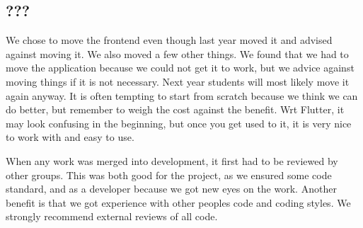 \subsection{???}
We chose to move the frontend even though last year moved it and advised against moving it. We also moved a few other things. We found that we had to move the application because we could not get it to work, but we advice against moving things if it is not necessary. Next year students will most likely move it again anyway. It is often tempting to start from scratch because we think we can do better, but remember to weigh the cost against the benefit. Wrt Flutter, it may look confusing in the beginning, but once you get used to it, it is very nice to work with and easy to use.

When any work was merged into development, it first had to be reviewed by other groups. This was both good for the project, as we ensured some code standard, and as a developer because we got new eyes on the work. Another benefit is that we got experience with other peoples code and coding styles. We strongly recommend external reviews of all code.
